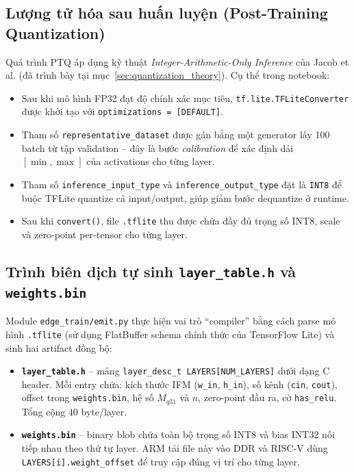 \subsection{Lượng tử hóa sau huấn luyện (Post-Training Quantization)}
Quá trình PTQ áp dụng kỹ thuật \textit{Integer-Arithmetic-Only Inference} của Jacob et al. \cite{jacob2018quantization} (đã trình bày tại mục~\ref{sec:quantization_theory}). Cụ thể trong notebook:

\begin{itemize}
    \item Sau khi mô hình FP32 đạt độ chính xác mục tiêu, \texttt{tf.lite.TFLiteConverter} được khởi tạo với \texttt{optimizations = [DEFAULT]}.
    \item Tham số \texttt{representative\_dataset} được gán bằng một generator lấy 100 batch từ tập validation -- đây là bước \textit{calibration} để xác định dải $[\min, \max]$ của activations cho từng layer.
    \item Tham số \texttt{inference\_input\_type} và \texttt{inference\_output\_type} đặt là \texttt{INT8} để buộc TFLite quantize cả input/output, giúp giảm bước dequantize ở runtime.
    \item Sau khi \texttt{convert()}, file \texttt{.tflite} thu được chứa đầy đủ trọng số INT8, scale và zero-point per-tensor cho từng layer.
\end{itemize}

\subsection{Trình biên dịch tự sinh \texttt{layer\_table.h} và \texttt{weights.bin}}
\label{ssec:emitter}
Module \texttt{edge\_train/emit.py} thực hiện vai trò ``compiler'' bằng cách parse mô hình \texttt{.tflite} (sử dụng FlatBuffer schema chính thức của TensorFlow Lite) và sinh hai artifact đồng bộ:

\begin{itemize}
    \item \textbf{\texttt{layer\_table.h}} -- mảng \texttt{layer\_desc\_t LAYERS[NUM\_LAYERS]} dưới dạng C header. Mỗi entry chứa: kích thước IFM (\texttt{w\_in}, \texttt{h\_in}), số kênh (\texttt{cin}, \texttt{cout}), offset trong \texttt{weights.bin}, hệ số $M_{q31}$ và $n$, zero-point đầu ra, cờ \texttt{has\_relu}. Tổng cộng 40 byte/layer.
    \item \textbf{\texttt{weights.bin}} -- binary blob chứa toàn bộ trọng số INT8 và bias INT32 nối tiếp nhau theo thứ tự layer. ARM tải file này vào DDR và RISC-V dùng \texttt{LAYERS[i].weight\_offset} để truy cập đúng vị trí cho từng layer.
\end{itemize}


